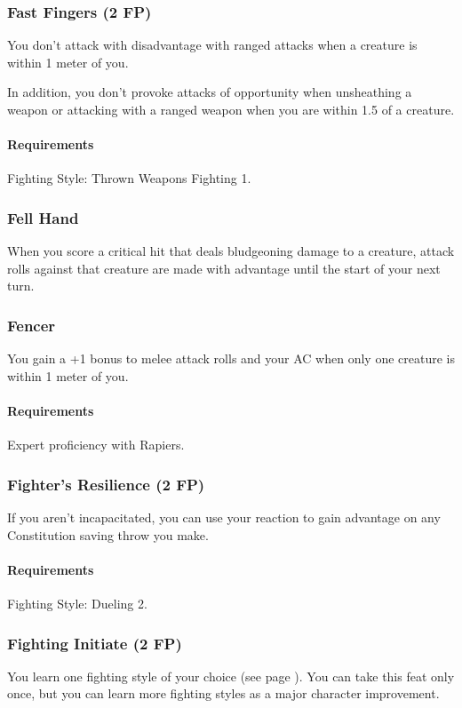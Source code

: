 \subsubsection{Fast Fingers (2 FP)} \label{feat::fastfingers}
    You don't attack with disadvantage with ranged attacks when a creature is within 1 meter of you.

    In addition, you don't provoke attacks of opportunity when unsheathing a weapon or attacking with a ranged weapon when you are within 1.5 of a creature.
    \paragraph{Requirements} Fighting Style: Thrown Weapons Fighting 1.
\subsubsection{Fell Hand} \label{feat::fellhand}
    When you score a critical hit that deals bludgeoning damage to a creature, attack rolls against that creature are made with advantage until the start of your next turn.
\subsubsection{Fencer} \label{feat::fencer}
    You gain a +1 bonus to melee attack rolls and your AC when only one creature is within 1 meter of you.
    \paragraph{Requirements} Expert proficiency with Rapiers.
\subsubsection{Fighter's Resilience (2 FP)} \label{feat::fightersresilience}
    If you aren't incapacitated, you can use your reaction to gain advantage on any Constitution saving throw you make.
    \paragraph{Requirements} Fighting Style: Dueling 2.
\subsubsection{Fighting Initiate (2 FP)} \label{feat::fightinginitiate}
    You learn one fighting style of your choice (see page \pageref{ssec::fightingstyles}).
    You can take this feat only once, but you can learn more fighting styles as a major character improvement.
